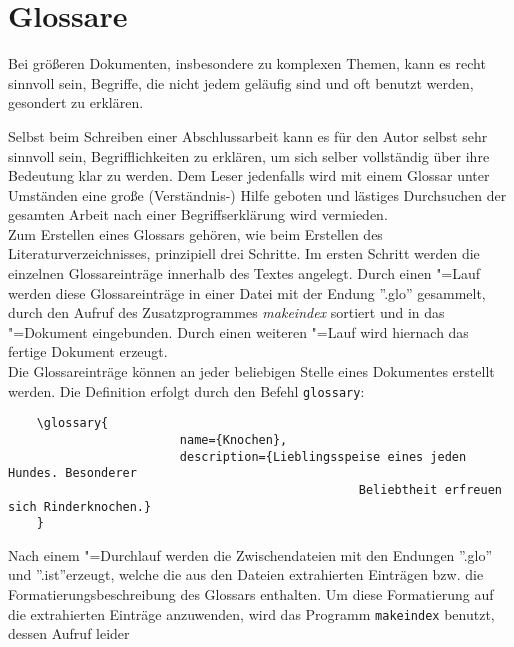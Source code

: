 %
%

\section{Glossare}
\label{sec:glossar}

Bei größeren Dokumenten, insbesondere zu komplexen Themen, kann es recht
sinnvoll sein, Begriffe, die nicht jedem geläufig sind und oft benutzt
werden, gesondert zu erklären.

Selbst beim Schreiben einer Abschlussarbeit kann es für den Autor selbst
sehr sinnvoll sein, Begrifflichkeiten zu erklären, um sich selber vollständig
über ihre Bedeutung klar zu werden. Dem Leser jedenfalls wird mit einem Glossar
unter Umständen eine große (Verständnis-) Hilfe geboten und lästiges
Durchsuchen der gesamten Arbeit nach einer Begriffserklärung wird vermieden.
\vspace{1em}
\\
Zum Erstellen eines Glossars gehören, wie beim Erstellen des Literaturverzeichnisses,
 prinzipiell drei Schritte.
Im ersten Schritt werden die einzelnen Glossareinträge innerhalb des Textes
angelegt. Durch einen \DMLLaTeX"=Lauf werden diese Glossareinträge in
einer Datei mit der Endung ''.glo'' gesammelt, durch den Aufruf des
Zusatzprogrammes \emph{makeindex} sortiert und in das \DMLLaTeX"=Dokument
eingebunden. Durch einen weiteren \DMLLaTeX"=Lauf wird hiernach das fertige
Dokument erzeugt.
\vspace{1em}
\\
Die Glossareinträge können an jeder beliebigen Stelle eines Dokumentes erstellt werden.
Die Definition erfolgt durch den Befehl \texttt{glossary}:
\begin{verbatim}
	\glossary{
						name={Knochen},
						description={Lieblingsspeise eines jeden Hundes. Besonderer
												 Beliebtheit erfreuen sich Rinderknochen.}
	}
\end{verbatim}
Nach einem  \DMLLaTeX"=Durchlauf werden die Zwischendateien mit den Endungen ''.glo'' und
''.ist''erzeugt, welche die aus den Dateien extrahierten Einträgen bzw. die
Formatierungsbeschreibung des Glossars enthalten. Um diese Formatierung auf die extrahierten
Einträge anzuwenden, wird das Programm \texttt{makeindex} benutzt, dessen Aufruf leider
